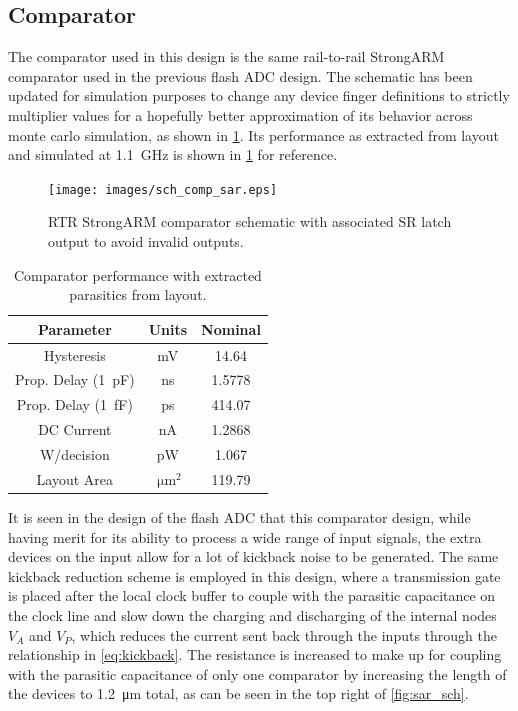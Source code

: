 \documentclass[11pt,letterpaper]{article}
\begin{document}
\subsection{Comparator}

The comparator used in this design is the same rail-to-rail StrongARM comparator used in the previous flash ADC design. The schematic has been updated for simulation purposes to change any device finger definitions to strictly multiplier values for a hopefully better approximation of its behavior across monte carlo simulation, as shown in \cref{fig:comp_sch}. Its performance as extracted from layout and simulated at \qty{1.1}{\GHz} is shown in \cref{tab:comp_perf} for reference.

\begin{figure}[htbp!]
		\centering
	    \texttt{[image: images/sch\_comp\_sar.eps]}
		\caption{RTR StrongARM comparator schematic with associated SR latch output to avoid invalid outputs.}\label{fig:comp_sch}
\end{figure}

\begin{table}[htbp!]
    \centering
    \begin{tabular}{ccc}
    \toprule
        Parameter & Units & Nominal \\
    \midrule
        Hysteresis & mV & 14.64 \\
        Prop. Delay (\qty{1}{\pF}) & ns & 1.5778 \\
        Prop. Delay (\qty{1}{\fF}) & ps & 414.07 \\
        DC Current & nA & 1.2868 \\
        W/decision & pW & 1.067 \\
        Layout Area & \(\qty{}{\um^2}\) & 119.79 \\
    \bottomrule
        
    \end{tabular}
    \caption{Comparator performance with extracted parasitics from layout.}\label{tab:comp_perf}
\end{table}

It is seen in the design of the flash ADC that this comparator design, while having merit for its ability to process a wide range of input signals, the extra devices on the input allow for a lot of kickback noise to be generated. The same kickback reduction scheme is employed in this design, where a transmission gate is placed after the local clock buffer to couple with the parasitic capacitance on the clock line and slow down the charging and discharging of the internal nodes \(V_A\) and \(V_P\), which reduces the current sent back through the inputs through the relationship in \cref{eq:kickback}. The resistance is increased to make up for coupling with the parasitic capacitance of only one comparator by increasing the length of the devices to \qty{1.2}{\um} total, as can be seen in the top right of \cref{fig:sar_sch}.
\end{document}
